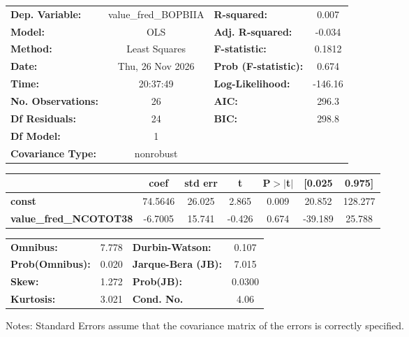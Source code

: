 \begin{center}
\begin{tabular}{lclc}
\toprule
\textbf{Dep. Variable:}        & value\_fred\_BOPBIIA & \textbf{  R-squared:         } &     0.007   \\
\textbf{Model:}                &         OLS          & \textbf{  Adj. R-squared:    } &    -0.034   \\
\textbf{Method:}               &    Least Squares     & \textbf{  F-statistic:       } &    0.1812   \\
\textbf{Date:}                 &   Thu, 26 Nov 2026   & \textbf{  Prob (F-statistic):} &    0.674    \\
\textbf{Time:}                 &       20:37:49       & \textbf{  Log-Likelihood:    } &   -146.16   \\
\textbf{No. Observations:}     &            26        & \textbf{  AIC:               } &     296.3   \\
\textbf{Df Residuals:}         &            24        & \textbf{  BIC:               } &     298.8   \\
\textbf{Df Model:}             &             1        & \textbf{                     } &             \\
\textbf{Covariance Type:}      &      nonrobust       & \textbf{                     } &             \\
\bottomrule
\end{tabular}
\begin{tabular}{lcccccc}
                               & \textbf{coef} & \textbf{std err} & \textbf{t} & \textbf{P$> |$t$|$} & \textbf{[0.025} & \textbf{0.975]}  \\
\midrule
\textbf{const}                 &      74.5646  &       26.025     &     2.865  &         0.009        &       20.852    &      128.277     \\
\textbf{value\_fred\_NCOTOT38} &      -6.7005  &       15.741     &    -0.426  &         0.674        &      -39.189    &       25.788     \\
\bottomrule
\end{tabular}
\begin{tabular}{lclc}
\textbf{Omnibus:}       &  7.778 & \textbf{  Durbin-Watson:     } &    0.107  \\
\textbf{Prob(Omnibus):} &  0.020 & \textbf{  Jarque-Bera (JB):  } &    7.015  \\
\textbf{Skew:}          &  1.272 & \textbf{  Prob(JB):          } &   0.0300  \\
\textbf{Kurtosis:}      &  3.021 & \textbf{  Cond. No.          } &     4.06  \\
\bottomrule
\end{tabular}
\end{center}

Notes: \newline
 [1] Standard Errors assume that the covariance matrix of the errors is correctly specified.
